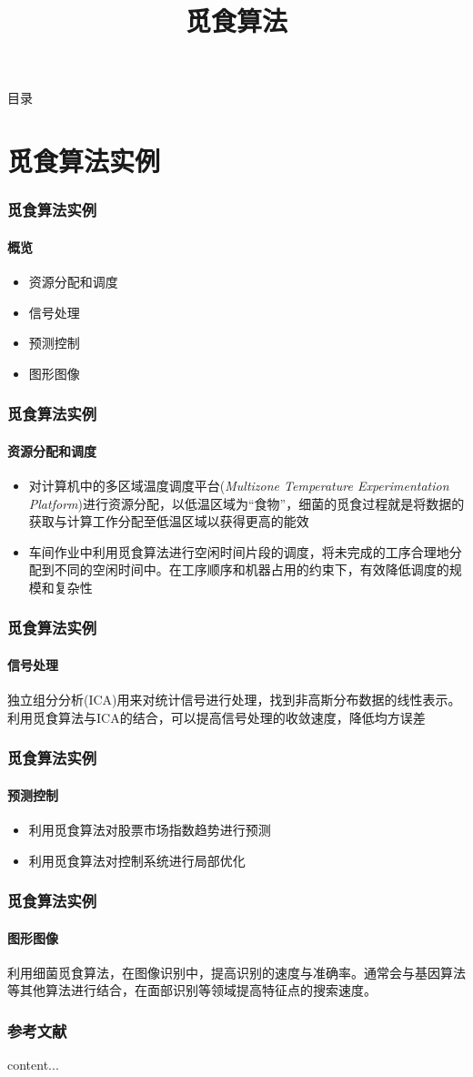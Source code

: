 \documentclass[UTF8]{beamer}
\begin{document}
	
\begin{frame}
\title{觅食算法}
\titlepage
\end{frame}

\begin{frame}{目录}
\tableofcontents
\end{frame}


\section{觅食算法实例}

\begin{frame}
\frametitle{觅食算法实例}
\framesubtitle{概览}
	\begin{itemize}
	\item 资源分配和调度
	\item 信号处理
	\item 预测控制
	\item 图形图像
	\end{itemize}
\end{frame}

\begin{frame}
\frametitle{觅食算法实例}
\framesubtitle{资源分配和调度}
\begin{itemize}
	\item 对计算机中的多区域温度调度平台(\textit{Multizone Temperature Experimentation Platform})进行资源分配，以低温区域为“食物”，细菌的觅食过程就是将数据的获取与计算工作分配至低温区域以获得更高的能效
	\item 车间作业中利用觅食算法进行空闲时间片段的调度，将未完成的工序合理地分配到不同的空闲时间中。在工序顺序和机器占用的约束下，有效降低调度的规模和复杂性
\end{itemize}
\end{frame}

\begin{frame}
\frametitle{觅食算法实例}
\framesubtitle{信号处理}
独立组分分析(ICA)用来对统计信号进行处理，找到非高斯分布数据的线性表示。利用觅食算法与ICA的结合，可以提高信号处理的收敛速度，降低均方误差
\end{frame}

\begin{frame}
\frametitle{觅食算法实例}
\framesubtitle{预测控制}
\begin{itemize}
	\item 利用觅食算法对股票市场指数趋势进行预测
	\item 利用觅食算法对控制系统进行局部优化
\end{itemize}
\end{frame}

\begin{frame}
\frametitle{觅食算法实例}
\framesubtitle{图形图像}
利用细菌觅食算法，在图像识别中，提高识别的速度与准确率。通常会与基因算法等其他算法进行结合，在面部识别等领域提高特征点的搜索速度。
\end{frame}


\begin{frame}
\frametitle{参考文献}
\begin{thebibliography}{widestlabel}
	content...
\end{thebibliography}
\end{frame}
\end{document}

